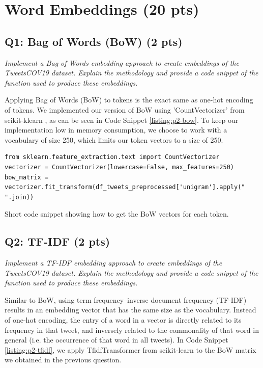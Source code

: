 \section*{Word Embeddings (20 pts)}


\subsection*{Q1: Bag of Words (BoW) (2 pts)}
\textit{Implement a Bag of Words embedding approach to create embeddings of the TweetsCOV19 dataset. Explain the methodology and provide a code snippet of the function used to produce these embeddings.}

Applying Bag of Words (BoW) \cite{bow} to tokens is the exact same as one-hot encoding of tokens.  We implemented our version of BoW using 'CountVectorizer' from scikit-klearn \cite{sklearn1, sklearn2}, as can be seen in Code Snippet \ref{listing:p2-bow}. To keep our implementation low in memory consumption, we choose to work with a vocabulary of size 250, which limits our token vectors to a size of 250.

\begin{listing*}
\begin{verbatim}
from sklearn.feature_extraction.text import CountVectorizer
vectorizer = CountVectorizer(lowercase=False, max_features=250)
bow_matrix = vectorizer.fit_transform(df_tweets_preprocessed['unigram'].apply(" ".join))
\end{verbatim}
\caption{Short code snippet showing how to get the BoW vectors for each token.}
\label{listing:p2-bow}
\end{listing*}


\subsection*{Q2: TF-IDF (2 pts)}
\textit{Implement a TF-IDF \cite{tfidf} embedding approach to create embeddings of the TweetsCOV19 dataset. Explain the methodology and provide a code snippet of the function used to produce these embeddings.}

Similar to BoW, using term frequency–inverse document frequency (TF-IDF) \cite{tfidf} results in an embedding vector that has the same size as the vocabulary.  Instead of one-hot encoding, the entry of a word in a vector is directly related to its frequency in that tweet, and inversely related to the commonality of that word in general (i.e. the occurrence of that word in all tweets).  In Code Snippet \ref{listing:p2-tfidf}, we apply TfidfTransformer from scikit-learn \cite{sklearn1, sklearn2} to the BoW matrix we obtained in the previous question.

